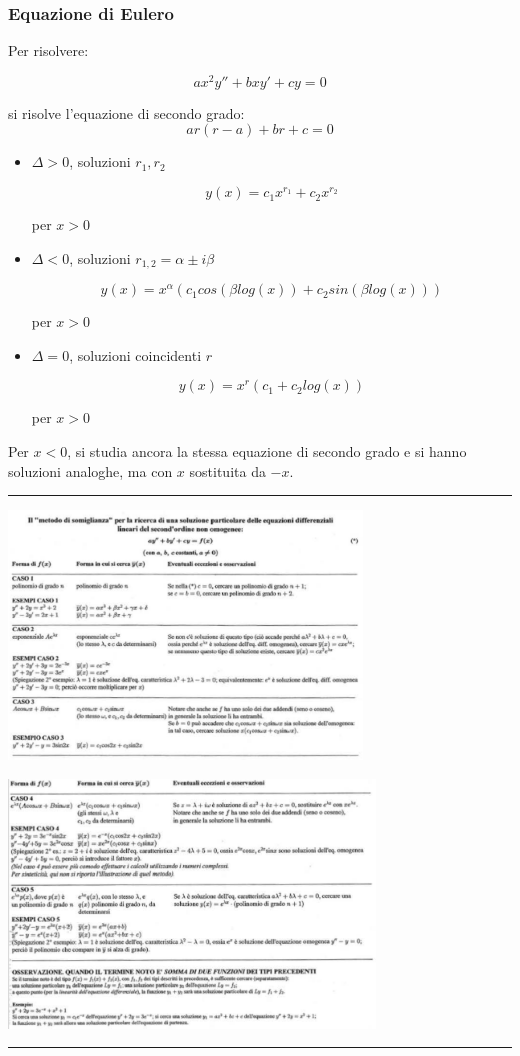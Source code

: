 \subsubsection*{Equazione di Eulero}
Per risolvere:
\begin{tcolorbox}
\[
    ax^2y''+bxy'+cy= 0
\]
\end{tcolorbox}
si risolve l'equazione di secondo grado:
\[
    ar(r-a)+br+c = 0
\]
\begin{itemize}
    \item $\Delta >0$, soluzioni $r_1, r_2$
    \begin{tcolorbox}
    \[
        y(x) =c_1x^{r_1}+c_2x^{r_2}
    \]
    \end{tcolorbox}
    per $x>0$
    \item $\Delta <0$, soluzioni $r_{1,2} = \alpha \pm i \beta$
    \begin{tcolorbox}
    \[
        y(x) = x^{\alpha}(c_1 cos(\beta log(x)) + c_2 sin(\beta log(x)))
    \]
    \end{tcolorbox}
    per $x>0$
    \item $\Delta = 0$, soluzioni coincidenti $r$
    \begin{tcolorbox}
    \[
        y(x) = x^r(c_1 + c_2log(x))
    \]
    \end{tcolorbox}
    per $x>0$
\end{itemize}
Per $x<0$, si studia ancora la stessa equazione di secondo grado e si hanno soluzioni analoghe, ma con $x$ sostituita da $-x$.\newline
\rule{\textwidth}{0,4pt}\newline
\begin{tcolorbox}
\begin{center}
    \includegraphics[height=250px]{../img/eqdiff2.PNG}
\end{center}
\begin{center}
    \includegraphics[height=250px]{../img/eqdiff2(1).PNG}
\end{center}
\end{tcolorbox}
\rule{\textwidth}{0,4pt}
